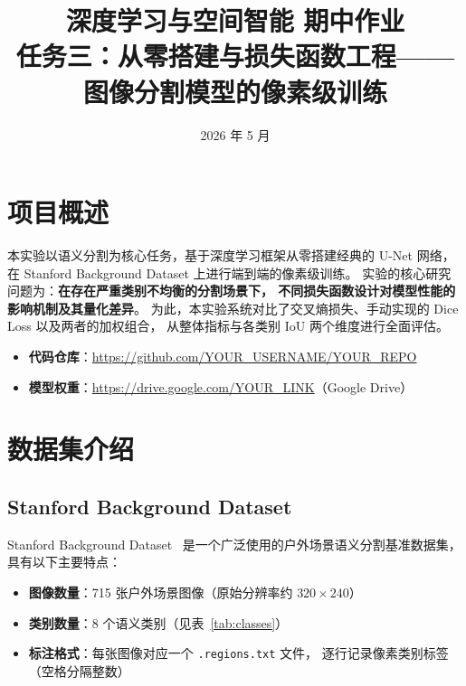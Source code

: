 \documentclass[12pt, a4paper]{article}
\title{
    \textbf{深度学习与空间智能 期中作业}\\[0.5em]
    \large 任务三：从零搭建与损失函数工程——图像分割模型的像素级训练
}
\date{2026 年 5 月}
\begin{document}
\maketitle
\tableofcontents
\newpage

\section{项目概述}

本实验以语义分割为核心任务，基于深度学习框架从零搭建经典的 U-Net 网络，
在 Stanford Background Dataset 上进行端到端的像素级训练。
实验的核心研究问题为：\textbf{在存在严重类别不均衡的分割场景下，
不同损失函数设计对模型性能的影响机制及其量化差异}。
为此，本实验系统对比了交叉熵损失、手动实现的 Dice Loss 以及两者的加权组合，
从整体指标与各类别 IoU 两个维度进行全面评估。

\begin{itemize}
    \item \textbf{代码仓库}：\url{https://github.com/YOUR_USERNAME/YOUR_REPO}
    \item \textbf{模型权重}：\url{https://drive.google.com/YOUR_LINK}（Google Drive）
\end{itemize}

\section{数据集介绍}

\subsection{Stanford Background Dataset}

Stanford Background Dataset~\cite{gould2009decomposing} 是一个广泛使用的户外场景语义分割基准数据集，
具有以下主要特点：

\begin{itemize}
    \item \textbf{图像数量}：715 张户外场景图像（原始分辨率约 $320 \times 240$）
    \item \textbf{类别数量}：8 个语义类别（见表~\ref{tab:classes}）
    \item \textbf{标注格式}：每张图像对应一个 \texttt{.regions.txt} 文件，
          逐行记录像素类别标签（空格分隔整数）
\end{itemize}
\end{document}
